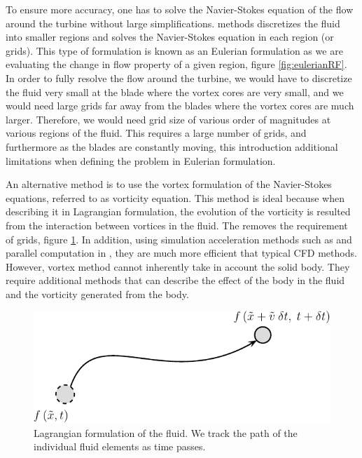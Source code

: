 To ensure more accuracy, one has to solve the Navier-Stokes equation of the flow around the turbine without large simplifications.  methods discretizes the fluid into smaller regions and solves the Navier-Stokes equation in each region (or grids). This type of formulation is known as an Eulerian formulation as we are evaluating the change in flow property of a given region, figure \ref{fig:eulerianRF}. In order to fully resolve the flow around the turbine, we would have to discretize the fluid very small at the blade where the vortex cores are very small, and we would need large grids far away from the blades where the vortex cores are much larger. Therefore, we would need grid size of various order of magnitudes at various regions of the fluid. This requires a large number of grids, and furthermore as the blades are constantly moving, this introduction additional limitations when defining the problem in Eulerian formulation.

An alternative method is to use the vortex formulation of the Navier-Stokes equations, referred to as vorticity equation. This method is ideal because when describing it in Lagrangian formulation, the evolution of the vorticity is resulted from the interaction between vortices in the fluid. The removes the requirement of grids, figure \ref{fig:lagrangianRF}. In addition, using simulation acceleration methods such as  and parallel computation in , they are much more efficient that typical CFD methods. However, vortex method cannot inherently take in account the solid body. They require additional methods that can describe the effect of the body in the fluid and the vorticity generated from the body.

	\begin{figure}[!t]
		\centering
		\includegraphics[width=0.4\linewidth]{figures/introduction/lagrangianRF2-crop.pdf}
		\caption{Lagrangian formulation of the fluid. We track the path of the individual fluid elements as time passes.}
		\label{fig:lagrangianRF}
	\end{figure}

